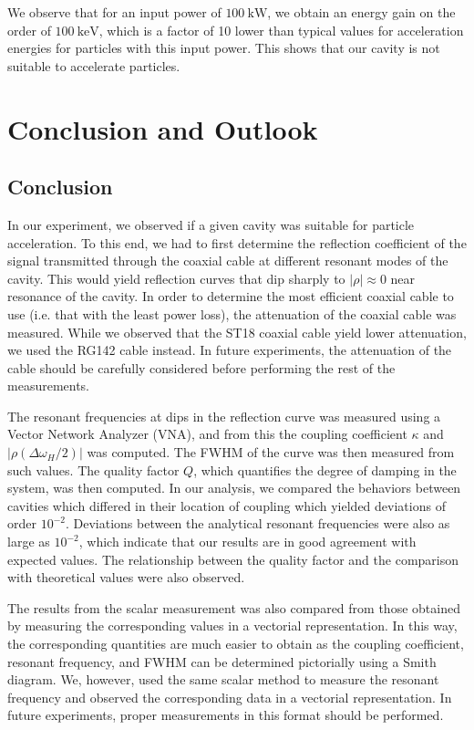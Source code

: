 \documentclass[a4paper]{report}
\numberwithin{equation}{section}
\begin{document}
We observe that for an input power of $\SI{100}{\kilo\watt}$, we obtain an energy gain on the order of $\SI{100}{\kilo\electronvolt}$, 
which is a factor of 10 lower than typical values for acceleration energies for particles with this input power. This 
shows that our cavity is not suitable to accelerate particles. \par 

\chapter{Conclusion and Outlook}

\section{Conclusion}

In our experiment, we observed if a given cavity was suitable for particle acceleration. To this end, we had to first determine
the reflection coefficient of the signal transmitted through the coaxial cable at different resonant modes of the cavity. This
would yield reflection curves that dip sharply to $|\rho| \approx 0$ near resonance of the cavity. In order to determine the 
most efficient coaxial cable to use (i.e. that with the least power loss), the attenuation of the coaxial cable was measured. 
While we observed that the ST18 coaxial cable yield lower attenuation, we used the RG142 cable instead. In future experiments,
the attenuation of the cable should be carefully considered before performing the rest of the measurements. \par 

The resonant frequencies at dips in the reflection curve was measured using a Vector Network Analyzer (VNA), and from this the coupling coefficient $\kappa$
and $|\rho(\Delta\omega_H / 2)|$ was computed. The FWHM of the curve was then measured from such values. The quality factor $Q$, 
which quantifies the degree of damping in the system, was then computed. In our analysis, we compared the behaviors between  
cavities which differed in their location of coupling which yielded deviations of order $10^{-2}$. Deviations between the 
analytical resonant frequencies were also as large as $10^{-2}$, which indicate that our results are in good agreement with
expected values. The relationship between the quality factor and the comparison with theoretical values were also observed. \par 

The results from the scalar measurement was also compared from those obtained by measuring the corresponding values in a vectorial representation. In this way, the corresponding quantities are much easier to 
obtain as the coupling coefficient, resonant frequency, and FWHM can be determined pictorially using a Smith diagram. We, however,
used the same scalar method to measure the resonant frequency and observed the corresponding data in a vectorial representation. 
In future experiments, proper measurements in this format should be performed. \par 
\end{document}
